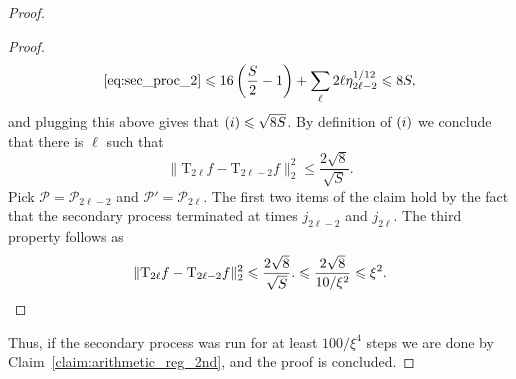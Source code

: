 \documentclass[10pt,a4paper]{amsart}
\newcommand\norm[1]{\| #1 \|}
\renewcommand\leq{\leqslant}
\newcommand{\rom}[1]{\uppercase\expandafter{\romannumeral #1\relax}}
\begin{document}
\begin{proof}
\begin{proof}
        \[
        \eqref{eq:sec_proc_2}\leq 16\left(\frac{S}{2}-1\right)+
        \sum\limits_{\ell}2\ell \eta_{2\ell-2}^{1/12}
        \leq 8S,
        \]
        and plugging this above gives that $(\rom{1})\leq \sqrt{8S}$. 
        By definition of $(\rom{1})$ 
        we conclude that there is $\ell$ such that
        \[
        \norm{\mathrm{T}_{2\ell} f - \mathrm{T}_{2\ell-2}f}_2^2\leq \frac{2\sqrt{8}}{\sqrt{S}}.
        \] 
    Pick $\mathcal{P} = \mathcal{P}_{2\ell-2}$ and 
    $\mathcal{P}'=\mathcal{P}_{2\ell}$. The first two items of the claim hold by the fact that the secondary process terminated at times $j_{2\ell-2}$ and $j_{2\ell}$. The third property follows as
  \[
        \norm{\mathrm{T}_{2\ell} f - \mathrm{T}_{2\ell-2}f}_2^2\leq \frac{2\sqrt{8}}{\sqrt{S}}.
        \leq \frac{2\sqrt{8}}{10/\xi^2}\leq \xi^2.
        \qedhere
        \] 
    \end{proof}
    Thus, if the secondary process was run for at least $100/\xi^4$ steps we are done by Claim~\ref{claim:arithmetic_reg_2nd}, and the proof is concluded.
\end{proof}
\end{document}
